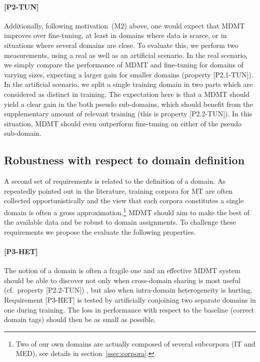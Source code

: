 \documentclass[11pt]{article}
\newcommand{\fyTodo}[1]{\Todo[FY:]{\textcolor{orange}{#1}}}
\newcommand{\jcDone}[1]{\done[JC]\Todo[JC:]{\textcolor{blue}{#1}}}
\begin{document}
\paragraph{[P2-TUN]} Additionally, following motivation~(M2) above, one would expect that MDMT improves over fine-tuning, at least in domains where data is scarce, or in situations where several domains are close. To evaluate this, we perform two measurements, using a real as well as an artificial scenario. In the real scenario, we simply compare the performance of MDMT and fine-tuning for domains of varying sizes, expecting a larger gain for smaller domains (property [P2.1-TUN]). In the artificial scenario, we split a single training domain in two parts which are considered as distinct in training. The expectation here is that a MDMT should yield a clear gain in the both pseudo sub-domains, which should benefit from the supplementary amount of relevant training (this is property [P2.2-TUN]). In this situation, MDMT should even outperform fine-tuning on either of the pseudo sub-domain.
\jcDone{I dont understand the prediction... why running MDMT on 2 artificial subdomains should show  gains over fine-tunning?}\fyTodo{Clearer now ?}

\subsection{Robustness with respect to domain definition \label{ssec:robusness}}
A second set of requirements is related to the definition of a domain. As repeatedly pointed out in the literature, training corpora for MT are often collected opportunistically and the view that each corpora constitutes a single domain is often a gross approximation.\footnote{Two of our own domains are actually composed of several subcorpora (IT and MED), see details in section~\ref{ssec:corpora}.} MDMT should aim to make the best of the available data and be robust to domain assignments. To challenge these requirements we propose the evaluate the following properties.

\paragraph{[P3-HET]}
The notion of a domain is often a fragile one and an effective MDMT system should be able to discover not only when cross-domain sharing is most useful (cf.\ property [P2.2-TUN]) \jcDone{what is P2.2?}, but also when intra-domain heterogeneity is hurting. Requirement [P3-HET] is tested by artificially conjoining two separate domains in one during training. The loss in performance with respect to the baseline (correct domain tags) should then be as small as possible.
\end{document}
